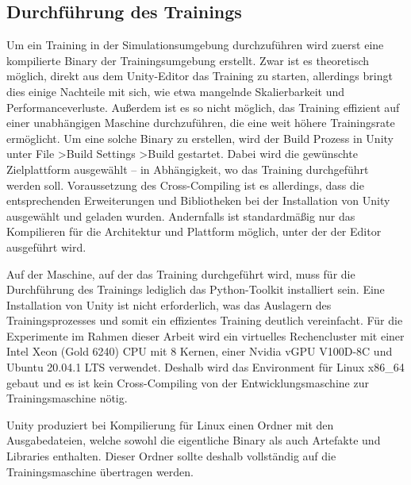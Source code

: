 \subsection{Durchführung des Trainings}
Um ein Training in der Simulationsumgebung durchzuführen wird zuerst eine kompilierte Binary der Trainingsumgebung erstellt.
Zwar ist es theoretisch möglich, direkt aus dem Unity-Editor das Training zu starten, allerdings bringt dies einige Nachteile mit sich, wie etwa mangelnde Skalierbarkeit und Performanceverluste.
Außerdem ist es so nicht möglich, das Training effizient auf einer unabhängigen Maschine durchzuführen, die eine weit höhere Trainingsrate ermöglicht.
Um eine solche Binary zu erstellen, wird der Build Prozess in Unity unter File \textgreater Build Settings \textgreater Build gestartet.
Dabei wird die gewünschte Zielplattform ausgewählt -- in Abhängigkeit, wo das Training durchgeführt werden soll.
Voraussetzung des Cross-Compiling ist es allerdings, dass die entsprechenden Erweiterungen und Bibliotheken bei der Installation von Unity ausgewählt und geladen wurden.
Andernfalls ist standardmäßig nur das Kompilieren für die Architektur und Plattform möglich, unter der der Editor ausgeführt wird.

Auf der Maschine, auf der das Training durchgeführt wird, muss für die Durchführung des Trainings lediglich das Python-Toolkit installiert sein.
Eine Installation von Unity ist nicht erforderlich, was das Auslagern des Trainingsprozesses und somit ein effizientes Training deutlich vereinfacht.
Für die Experimente im Rahmen dieser Arbeit wird ein virtuelles Rechencluster mit einer Intel Xeon (Gold 6240) CPU mit 8 Kernen, einer Nvidia vGPU V100D-8C und Ubuntu 20.04.1 LTS verwendet.
Deshalb wird das Environment für Linux x86\_64 gebaut und es ist kein Cross-Compiling von der Entwicklungsmaschine zur Trainingsmaschine nötig.

Unity produziert bei Kompilierung für Linux einen Ordner mit den Ausgabedateien, welche sowohl die eigentliche Binary als auch Artefakte und Libraries enthalten.
Dieser Ordner sollte deshalb vollständig auf die Trainingsmaschine übertragen werden.

